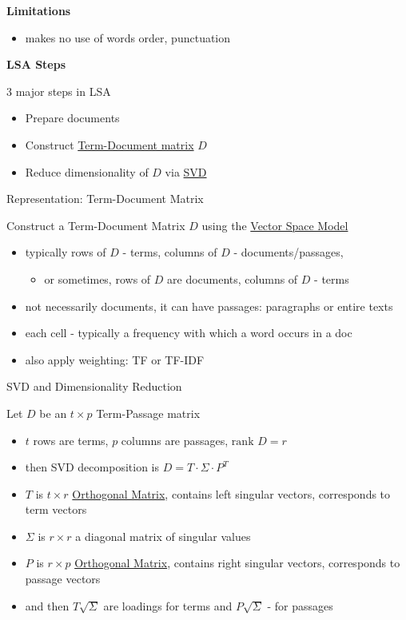 \textbf{Limitations}

\begin{itemize}
\itemsep1pt\parskip0pt
\item
  makes no use of words order, punctuation
\end{itemize}


\textbf{LSA Steps}

3 major steps in LSA \cite{evangelopoulos2012latent}

\begin{itemize}
\itemsep1pt\parskip0pt
\item
  Prepare documents
\item
  Construct \href{Vector Space Models}{Term-Document matrix} $D$
\item
  Reduce dimensionality of $D$ via \url{SVD}
\end{itemize}


Representation: Term-Document Matrix

Construct a Term-Document Matrix $D$ using the
\href{Vector Space Model}{Vector Space Model}

\begin{itemize}
\itemsep1pt\parskip0pt
\item
  typically rows of $D$ - terms, columns of $D$ -
  documents/passages,

  \begin{itemize}
  \itemsep1pt\parskip0pt
  \item
    or sometimes, rows of $D$ are documents, columns of $D$ - terms
  \end{itemize}
\item
  not necessarily documents, it can have passages: paragraphs or entire
  texts
\item
  each cell - typically a frequency with which a word occurs in a doc
\item
  also apply weighting: TF or TF-IDF
\end{itemize}

SVD and Dimensionality Reduction

Let $D$ be an $t \times p$ Term-Passage matrix

\begin{itemize}
\itemsep1pt\parskip0pt
\item
  $t$ rows are terms, $p$ columns are passages,
  $\text{rank } D = r$
\item
  then SVD decomposition is $D = T \cdot
  \Sigma \cdot P^T$
\item
  $T$ is $t \times r$
  \href{Orthogonal Matrix}{Orthogonal Matrix}, contains left singular
  vectors, corresponds to term vectors
\item
  $\Sigma$ is $r \times r$ a diagonal
  matrix of singular values
\item
  $P$ is $r \times p$
  \href{Orthogonal Matrix}{Orthogonal Matrix}, contains right singular
  vectors, corresponds to passage vectors
\item
  and then $T \sqrt\Sigma$ are loadings
  for terms and $P \sqrt\Sigma$ - for
  passages
\end{itemize}

